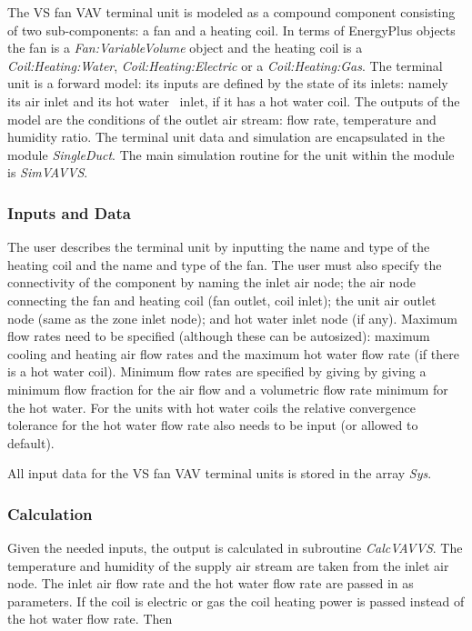 The VS fan VAV terminal unit is modeled as a compound component consisting of two sub-components: a fan and a heating coil. In terms of EnergyPlus objects the fan is a \emph{Fan:VariableVolume} object and the heating coil is a \emph{Coil:Heating:Water}, \emph{Coil:Heating:Electric} or a \emph{Coil:Heating:Gas}. The terminal unit is a forward model: its inputs are defined by the state of its inlets: namely its air inlet and its hot water~ inlet, if it has a hot water coil. The outputs of the model are the conditions of the outlet air stream: flow rate, temperature and humidity ratio. The terminal unit data and simulation are encapsulated in the module \emph{SingleDuct}. The main simulation routine for the unit within the module is \emph{SimVAVVS}.

\subsubsection{Inputs and Data}\label{inputs-and-data-2}

The user describes the terminal unit by inputting the name and type of the heating coil and the name and type of the fan. The user must also specify the connectivity of the component by naming the inlet air node; the air node connecting the fan and heating coil (fan outlet, coil inlet); the unit air outlet node (same as the zone inlet node); and hot water inlet node (if any). Maximum flow rates need to be specified (although these can be autosized): maximum cooling and heating air flow rates and the maximum hot water flow rate (if there is a hot water coil). Minimum flow rates are specified by giving by giving a minimum flow fraction for the air flow and a volumetric flow rate minimum for the hot water. For the units with hot water coils the relative convergence tolerance for the hot water flow rate also needs to be input (or allowed to default).

All input data for the VS fan VAV terminal units is stored in the array \emph{Sys}.

\subsubsection{Calculation}\label{calculation-2}

Given the needed inputs, the output is calculated in subroutine \emph{CalcVAVVS}. The temperature and humidity of the supply air stream are taken from the inlet air node. The inlet air flow rate and the hot water flow rate are passed in as parameters. If the coil is electric or gas the coil heating power is passed instead of the hot water flow rate. Then

